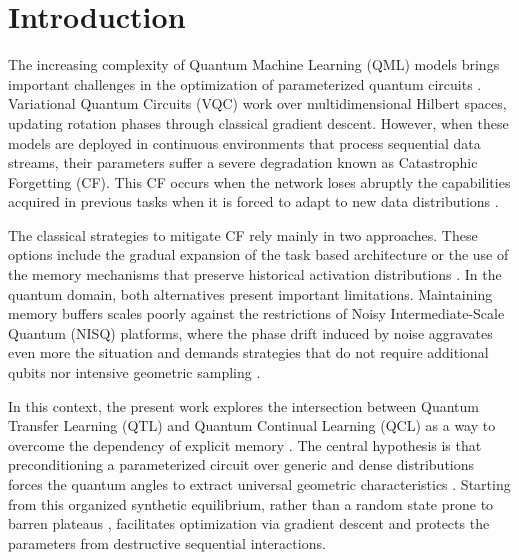 \documentclass[runningheads]{llncs}
\begin{document}
\section{Introduction}\label{sec:introduction}
The increasing complexity of Quantum Machine Learning (QML) \cite{RODRIGUEZ-DIAZ26} models brings important challenges in the optimization of parameterized quantum circuits \cite{cerezo2021variational,Mitarai18}. Variational Quantum Circuits (VQC) work over multidimensional Hilbert spaces, updating rotation phases through classical gradient descent. However, when these models are deployed in continuous environments that process sequential data streams, their parameters suffer a severe degradation known as Catastrophic Forgetting (CF). This CF occurs when the network loses abruptly the capabilities acquired in previous tasks when it is forced to adapt to new data distributions \cite{parisi2019continual}.

The classical strategies to mitigate CF rely mainly in two approaches. These options include the gradual expansion of the task based architecture or the use of the memory mechanisms that preserve historical activation distributions \cite{buzzega2020dark,kirkpatrick2017overcoming}. In the quantum domain, both alternatives present important limitations. Maintaining memory buffers scales poorly against the restrictions of Noisy Intermediate-Scale Quantum (NISQ) platforms, where the phase drift induced by noise aggravates even more the situation and demands strategies that do not require additional qubits nor intensive geometric sampling \cite{mcclean2018barren,pesah2021absence}.

In this context, the present work explores the intersection between Quantum Transfer Learning (QTL) and Quantum Continual Learning (QCL) as a way to overcome the dependency of explicit memory \cite{mari2020transfer,pan2009survey}. The central hypothesis is that preconditioning a parameterized circuit over generic and dense distributions forces the quantum angles to extract universal geometric characteristics \cite{cerezo2021variational,sim2019expressibility}. Starting from this organized synthetic equilibrium, rather than a random state prone to barren plateaus \cite{mcclean2018barren}, facilitates optimization via gradient descent and protects the parameters from destructive sequential interactions.
\end{document}
